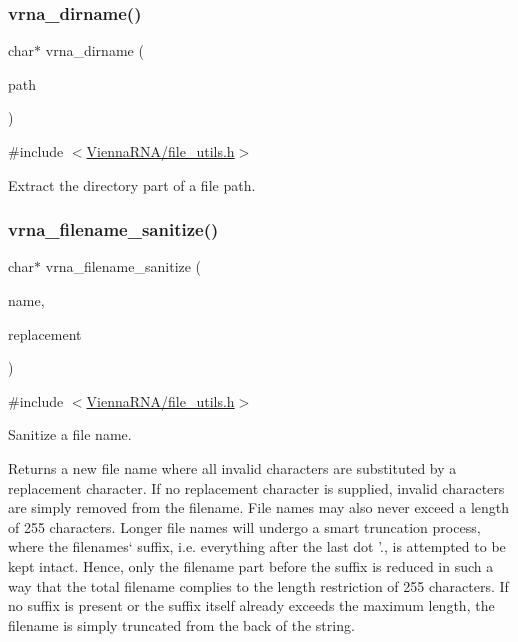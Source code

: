 \subsubsection{\texorpdfstring{vrna\+\_\+dirname()}{vrna\_dirname()}}
{\footnotesize\ttfamily char$\ast$ vrna\+\_\+dirname (\begin{DoxyParamCaption}\item[{const char $\ast$}]{path }\end{DoxyParamCaption})}



{\ttfamily \#include $<$\mbox{\hyperlink{file__utils_8h}{Vienna\+R\+N\+A/file\+\_\+utils.\+h}}$>$}



Extract the directory part of a file path. 

\mbox{\label{group__file__utils_ga72eae0a472bad905b6facccf5b453a76}} 
\subsubsection{\texorpdfstring{vrna\+\_\+filename\+\_\+sanitize()}{vrna\_filename\_sanitize()}}
{\footnotesize\ttfamily char$\ast$ vrna\+\_\+filename\+\_\+sanitize (\begin{DoxyParamCaption}\item[{const char $\ast$}]{name,  }\item[{const char $\ast$}]{replacement }\end{DoxyParamCaption})}



{\ttfamily \#include $<$\mbox{\hyperlink{file__utils_8h}{Vienna\+R\+N\+A/file\+\_\+utils.\+h}}$>$}



Sanitize a file name. 

Returns a new file name where all invalid characters are substituted by a replacement character. If no replacement character is supplied, invalid characters are simply removed from the filename. File names may also never exceed a length of 255 characters. Longer file names will undergo a \textquotesingle{}smart\textquotesingle{} truncation process, where the filenames` suffix, i.\+e. everything after the last dot '.\textquotesingle{}, is attempted to be kept intact. Hence, only the filename part before the suffix is reduced in such a way that the total filename complies to the length restriction of 255 characters. If no suffix is present or the suffix itself already exceeds the maximum length, the filename is simply truncated from the back of the string.


